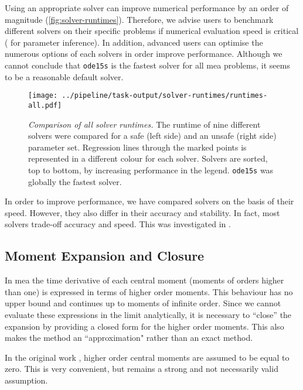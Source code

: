 Using an appropriate solver can improve numerical performance by an order of magnitude (\autoref{fig:solver-runtimes}).
Therefore, we advise users to benchmark different solvers on their specific problems if numerical evaluation speed is critical (\ie{} for parameter inference).
In addition, advanced users can optimise the numerous options of each solvers in order improve performance.
Although we cannot conclude that \texttt{ode15s} is the fastest solver for all \gls{mea} problems,
it seems to be a reasonable default solver.

\begin{figure}[bt]
    \centering
    \texttt{[image: ../pipeline/task-output/solver-runtimes/runtimes-all.pdf]}
    \caption{\emph{Comparison of all solver runtimes.}
    The runtime of nine different solvers were compared for a safe (left side) and an unsafe (right side) parameter set.
    Regression lines through the marked points is represented in a different colour for each solver.
    Solvers are sorted, top to bottom, by increasing performance in the legend.
    \texttt{ode15s} was globally the fastest solver.
    }
    \label{fig:solver-runtimes}
\end{figure}


In order to improve performance, we have compared solvers on the basis of their speed.
However, they also differ in their accuracy and stability. 
In fact, most solvers trade-off accuracy and speed\cite{sandu_benchmarking_1997}.
This was investigated in  .


\subsection{Moment Expansion and Closure}

In \gls{mea} the time derivative of each central moment (moments of orders higher than one) is expressed in terms of higher order moments.
This behaviour has no upper bound and continues up to moments of infinite order.
Since we cannot evaluate these expressions in the limit analytically, it is necessary to ``close'' the expansion by providing a closed form for the higher order moments.
This also makes the method an ``approximation" rather than an exact method.

In the original work \cite{ale_general_2013}, higher order central moments are assumed to be equal to zero.
This is very convenient, but remains a strong and not necessarily valid assumption.

